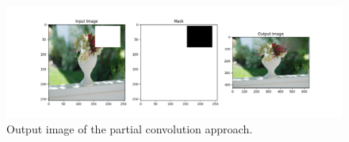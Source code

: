 \documentclass[10pt,twocolumn,letterpaper]{article}
\begin{document}
\begin{figure}[t]
    \centering
    \includegraphics[width=\linewidth]{figures/milestone/out_pconv.png}
    \caption{Output image of the partial convolution approach.}
    \label{fig:out_pconv}
\end{figure}

{\small


}
\end{document}
